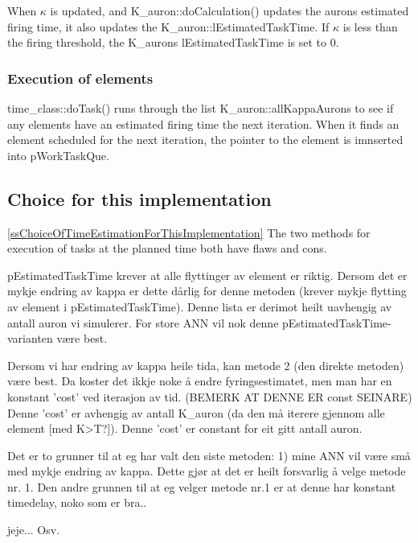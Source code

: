 	When $\kappa$ is updated, and K\_auron::doCalculation() updates the aurons estimated firing time, it also updates the K\_auron::lEstimatedTaskTime.
	If $\kappa$ is less than the firing threshold, the K\_aurons lEstimatedTaskTime is set to 0. 

	\subsubsection{Execution of elements}
	time\_class::doTask() runs through the list K\_auron::allKappaAurons to see if any elements have an estimated firing time the next iteration.
	When it finds an element scheduled for the next iteration, the pointer to the element is imnserted into pWorkTaskQue.


	\subsection{Choice for this implementation}
	\ref{ssChoiceOfTimeEstimationForThisImplementation}
	The two methods for execution of tasks at the planned time both have flaws and cons.
	
	pEstimatedTaskTime krever at alle flyttinger av element er riktig. Dersom det er mykje endring av kappa er dette dårlig for denne metoden (krever mykje flytting av element i pEstimatedTaskTime).
	Denne lista er derimot heilt uavhengig av antall auron vi simulerer. For store ANN vil nok denne pEstimatedTaskTime-varianten være best.

	Dersom vi har endring av kappa heile tida, kan metode 2 (den direkte metoden) være best.
	Da koster det ikkje noke å endre fyringsestimatet, men man har en konstant 'cost' ved iterasjon av tid. (BEMERK AT DENNE ER const SEINARE)
	Denne 'cost' er avhengig av antall K\_auron (da den må iterere gjennom alle element [med K>T?]). Denne 'cost' er constant for eit gitt antall auron.

	Det er to grunner til at eg har valt den siste metoden: 1) mine ANN vil være små med mykje endring av kappa. Dette gjør at det er heilt forsvarlig å velge metode nr. 1.
	Den andre grunnen til at eg velger metode nr.1 er at denne har konstant timedelay, noko som er bra..

	jeje... Osv.


